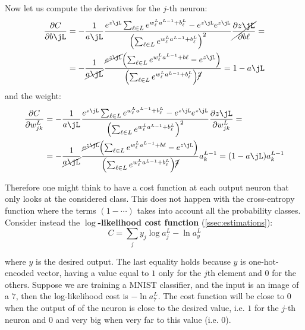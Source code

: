 \documentclass[12pt, letterpaper]{article}
\theoremstyle{definition}
\DeclarePairedDelimiter\autobracket{(}{)}
\newcommand{\br}[1]{\autobracket*{#1}}
\newcommand{\pr}{\mathrm{\partial}}
\let\tb\textbf
\begin{document}
Now let us compute the derivatives for the $j$-th neuron:
\begin{equation}
\begin{aligned}
\frac{\pr C}{\pr b\jL} &= -\frac{1}{a\jL} \frac{e^{z\jL}\sum_{\ell \in L}e^{ w_{\ell}^L a^{L-1}+b_\ell^L} -e^{z\jL}e^{z\jL}}{\br{\sum_{\ell \in L}e^{ w_{\ell}^L a^{L-1} +b_\ell^L}}^2} \cancel{\frac{\pr z\jL}{\pr b\ell}} = \\
&= -\frac{1}{\cancel{a\jL}} \frac{ \cancel{e^{z\jL}} \br{\sum_{\ell \in L}e^{ w_{\ell}^L a^{L-1} +b\ell} -e^{z\jL}}}{\br{\sum_{\ell \in L}e^{ w_{\ell}^L a^{L-1} +b_\ell^L}}\cancel{^2}}= 1- a\jL
\end{aligned}
\end{equation}
and the weight:
\begin{equation}
\begin{aligned}
\frac{\pr C}{\pr w_{jk}^L} &= -\frac{1}{a\jL} \frac{e^{z\jL}\sum_{\ell \in L}e^{ w_{\ell}^L a^{L-1}+b_\ell^L} -e^{z\jL}e^{z\jL}}{\br{\sum_{\ell \in L}e^{ w_{\ell}^L a^{L-1} +b_\ell^L}}^2} \frac{\pr z\jL}{\pr w_{jk}^L} = \\
&= -\frac{1}{\cancel{a\jL}} \frac{ \cancel{e^{z\jL}} \br{\sum_{\ell \in L}e^{ w_{\ell}^L a^{L-1} +b\ell} -e^{z\jL}}}{\br{\sum_{\ell \in L}e^{ w_{\ell}^L a^{L-1} +b_\ell^L}}\cancel{^2}} a_k^{L-1}= \br{1- a\jL} a_k^{L-1}
\end{aligned}
\end{equation}

Therefore one might think to have a cost function at each output neuron that only looks at the considered class. This does not happen with the cross-entropy function where the terms $(1-\cdots)$ takes into account all the probability classes. Consider instead the \tb{$\log$-likelihood cost function} (\autoref{ssec:estimations}):
\begin{equation}
C = \sum_j y_j \log a^L_j -\ln a_y^L
\end{equation}

where $y$ is the desired output. The last equality holds because $y$ is one-hot-encoded vector, having a value equal to $1$ only for the $j$th element and $0$ for the others. Suppose we are training a MNIST classifier, and the input is an image of a $7$, then the log-likelihood cost is $-\ln a^L_7$.  The cost function will be close to $0$ when the output of  of the neuron is close to the desired value, i.e. $1$ for the $j$-th neuron and $0$ and very big when very far to this value (i.e. $0$).
\end{document}
